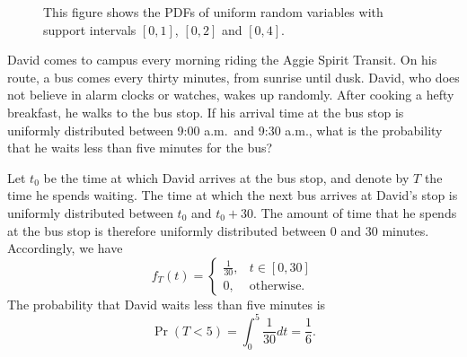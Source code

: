 \begin{figure}[ht]
\begin{center}
\end{center}
\caption{This figure shows the PDFs of uniform random variables with support intervals $[0,1]$, $[0,2]$ and $[0,4]$.}
\end{figure}

\begin{example}
David comes to campus every morning riding the Aggie Spirit Transit.
On his route, a bus comes every thirty minutes, from sunrise until dusk.
David, who does not believe in alarm clocks or watches, wakes up randomly.
After cooking a hefty breakfast, he walks to the bus stop.
If his arrival time at the bus stop is uniformly distributed between 9:00 a.m.\ and 9:30 a.m., what is the probability that he waits less than five minutes for the bus?

Let $t_0$ be the time at which David arrives at the bus stop, and denote by $T$ the time he spends waiting.
The time at which the next bus arrives at David's stop is uniformly distributed between $t_0$ and $t_0 + 30$.
The amount of time that he spends at the bus stop is therefore uniformly distributed between $0$ and $30$ minutes.
Accordingly, we have
\begin{equation*}
f_T(t) = \begin{cases} \frac{1}{30}, & t \in [0, 30] \\
0, & \text{otherwise}. \end{cases}
\end{equation*}
The probability that David waits less than five minutes is
\begin{equation*}
\Pr (T < 5) = \int_0^5 \frac{1}{30} dt = \frac{1}{6} .
\end{equation*}
\end{example}


